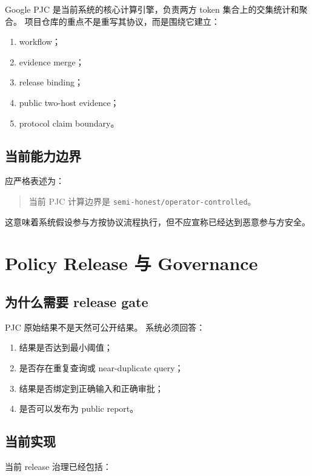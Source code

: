 \documentclass[UTF8,a4paper,12pt,oneside]{ctexrep}
\begin{document}
Google PJC 是当前系统的核心计算引擎，负责两方 token 集合上的交集统计和聚合。  
项目仓库的重点不是重写其协议，而是围绕它建立：

\begin{enumerate}
  \item workflow；
  \item evidence merge；
  \item release binding；
  \item public two-host evidence；
  \item protocol claim boundary。
\end{enumerate}

\subsection{当前能力边界}

应严格表述为：

\begin{quote}
当前 PJC 计算边界是 \texttt{semi-honest/operator-controlled}。
\end{quote}

这意味着系统假设参与方按协议流程执行，但不应宣称已经达到恶意参与方安全。

\section{Policy Release 与 Governance}

\subsection{为什么需要 release gate}

PJC 原始结果不是天然可公开结果。  
系统必须回答：

\begin{enumerate}
  \item 结果是否达到最小阈值；
  \item 是否存在重复查询或 near-duplicate query；
  \item 结果是否绑定到正确输入和正确审批；
  \item 是否可以发布为 public report。
\end{enumerate}

\subsection{当前实现}

当前 release 治理已经包括：
\end{document}
